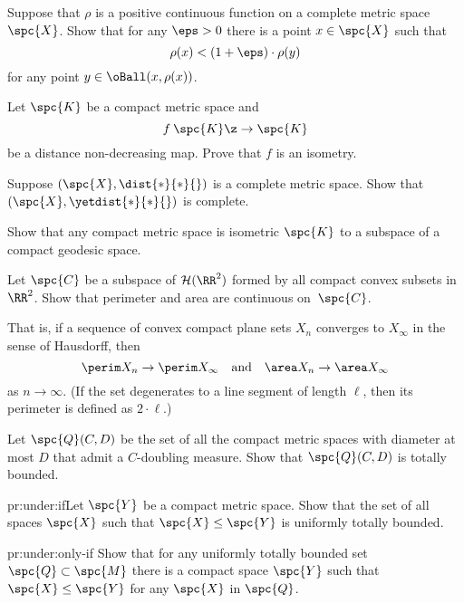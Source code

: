 \newpage
\pagestyle{empty}

\noindent Suppose that $\rho$ is a positive continuous function on a complete metric space $\spc{X}$.
Show that for any $\eps>0$ there is a point $x\in \spc{X}$ such that 
\[\rho(x)<(1+\eps)\cdot\rho(y)\]
for any point $y\in \oBall(x,\rho(x))$.

\vskip 50mm

\noindent Let $\spc{K}$  be a compact metric space and
\[f\:\spc{K}\z\to \spc{K}\] 
be a distance non-decreasing map.
Prove that $f$ is an isometry.

\vskip 50mm

\noindent 
Suppose $(\spc{X},\dist{*}{*}{})$ is a complete metric space.
Show that $(\spc{X},\yetdist{*}{*}{})$ is complete.

\newpage
\pagestyle{empty}

\noindent Show that any compact metric space is isometric $\spc{K}$ to a subspace of a compact geodesic space. 

\vskip 50mm

\noindent Let $\spc{C}$ be a subspace of $\mathcal{H}(\RR^2)$ formed by all compact convex subsets in $\RR^2$.
Show that perimeter and area are continuous on~$\spc{C}$.

That is, if a sequence of convex compact plane sets $X_n$ converges to $X_\infty$ in the sense of Hausdorff, then 
\[\perim X_n\to \perim X_\infty\quad\text{and}\quad\area X_n\to\area X_\infty\]
as $n\to\infty$.
(If the set degenerates to a line segment of length $\ell$, then its perimeter is defined as $2\cdot \ell$.)

\vskip 50mm

\noindent Let $\spc{Q}(C,D)$ be the set of all the compact metric spaces with diameter at most $D$ that admit a $C$-doubling measure.
Show that $\spc{Q}(C,D)$ is totally bounded.

\newpage
\pagestyle{empty}

\noindent
\begin{subthm}{pr:under:if}Let $\spc{Y}$ be a compact metric space.
Show that the set of all spaces $\spc{X}$ such that $\spc{X}\le\spc{Y}$
is uniformly totally bounded.
\end{subthm}

\begin{subthm}{pr:under:only-if}
Show that for any uniformly totally bounded set $\spc{Q}\subset\spc{M}$ there is a compact space $\spc{Y}$
such that $\spc{X}\le\spc{Y}$ for any $\spc{X}$ in $\spc{Q}$.
\end{subthm}

